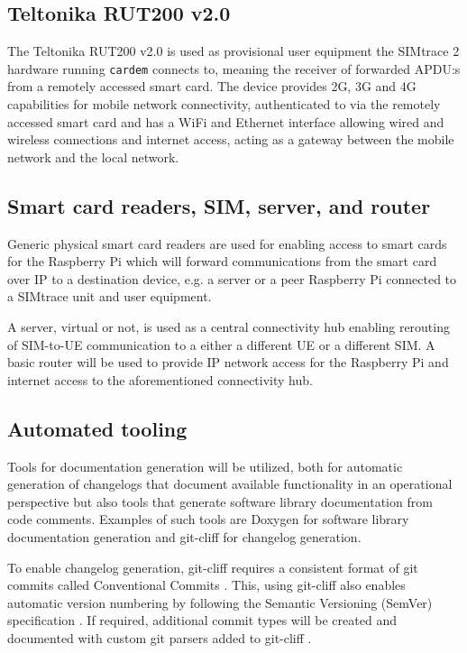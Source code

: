 \subsection{Teltonika RUT200 v2.0}

The Teltonika RUT200 v2.0 is used as provisional user equipment the
SIMtrace 2 hardware running \verb|cardem| connects to, meaning the
receiver of forwarded APDU:s from a remotely accessed smart card.
The device provides 2G, 3G and 4G capabilities for mobile network
connectivity, authenticated to via the remotely accessed smart card
and has a WiFi and Ethernet interface allowing wired and wireless
connections and internet access, acting as a gateway between the
mobile network and the local network.

\subsection{Smart card readers, SIM, server, and router}

Generic physical smart card readers are used for enabling access to
smart cards for the Raspberry Pi which will forward communications
from the smart card over IP to a destination device, e.g. a server
or a peer Raspberry Pi connected to a SIMtrace unit and user
equipment.

A server, virtual or not, is used as a central connectivity hub
enabling rerouting of SIM-to-UE communication to a either a
different UE or a different SIM. A basic router will be used to
provide IP network access for the Raspberry Pi and internet access
to the aforementioned connectivity hub.

\subsection{Automated tooling}

Tools for documentation generation will be utilized, both for
automatic generation of changelogs that document available
functionality in an operational perspective but also tools that
generate software library documentation from code comments.
Examples of such tools are Doxygen \cite{doxygen} for software
library documentation generation and git-cliff \cite{git-cliff} for
changelog generation.

To enable changelog generation, git-cliff requires a consistent
format of git commits \cite{git-cliff} called Conventional Commits
\cite{conventional-commits}. This, using git-cliff also enables
automatic version numbering \cite{git-cliff-bump-version} by
following the Semantic Versioning (SemVer) specification
\cite{semver}. If required, additional commit types will be created
and documented with custom git parsers added to git-cliff
\cite{git-cliff-tips-and-tricks}.

